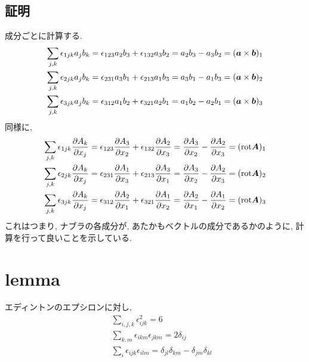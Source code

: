 \documentclass{jsarticle}
\newcommand*{\mbold}[1]{\mbox{\boldmath $#1$}}
\newcommand*{\rot}{{\rm rot}}
\begin{document}
\subsection{証明}
成分ごとに計算する. 
\begin{eqnarray}
  \sum_{j, k}\epsilon_{1jk}a_j b_k = \epsilon_{123}a_2 b_3 + \epsilon_{132}a_3 b_2 = a_2 b_3 - a_3 b_2 = (\mbold{a} \times \mbold{b})_1 \nonumber \\
  \sum_{j, k}\epsilon_{2jk}a_j b_k = \epsilon_{231}a_3 b_1 + \epsilon_{213}a_1 b_3 = a_3 b_1 - a_1 b_3 = (\mbold{a} \times \mbold{b})_2 \nonumber \\
  \sum_{j, k}\epsilon_{3jk}a_j b_k = \epsilon_{312}a_1 b_2 + \epsilon_{321}a_2 b_1 = a_1 b_2 - a_2 b_1 = (\mbold{a} \times \mbold{b})_3
\end{eqnarray}
同様に, 
\begin{eqnarray}
  \sum_{j, k}\epsilon_{1jk}\frac{\partial A_k}{\partial x_j}
  = \epsilon_{123}\frac{\partial A_3}{\partial x_2} + \epsilon_{132}\frac{\partial A_2}{\partial x_3}
  = \frac{\partial A_3}{\partial x_2} - \frac{\partial A_2}{\partial x_3} = (\rot \mbold{A})_1 \nonumber \\
  \sum_{j, k}\epsilon_{2jk}\frac{\partial A_k}{\partial x_j}
  = \epsilon_{231}\frac{\partial A_1}{\partial x_3} + \epsilon_{213}\frac{\partial A_3}{\partial x_1}
  = \frac{\partial A_3}{\partial x_2} - \frac{\partial A_2}{\partial x_3} = (\rot \mbold{A})_2 \nonumber \\
  \sum_{j, k}\epsilon_{3jk}\frac{\partial A_k}{\partial x_j}
  = \epsilon_{312}\frac{\partial A_2}{\partial x_1} + \epsilon_{321}\frac{\partial A_1}{\partial x_2}
  = \frac{\partial A_2}{\partial x_1} - \frac{\partial A_1}{\partial x_2} = (\rot \mbold{A})_3 \nonumber \\
\end{eqnarray}
これはつまり, ナブラの各成分が, あたかもベクトルの成分であるかのように, 計算を行って良いことを示している. 
\section{lemma}
エディントンのエプシロンに対し, 
\begin{subequations}
  \begin{eqnarray}
    && \sum_{i, j, k}\epsilon_{ijk}^2 = 6 \\
    && \sum_{k, m}\epsilon_{ikm}\epsilon_{jkm} = 2\delta_{ij} \\
    && \sum_{i}\epsilon_{ijk}\epsilon_{ilm} = \delta_{jl}\delta_{km} - \delta_{jm}\delta_{kl}
  \end{eqnarray}
\end{subequations}
\end{document}
